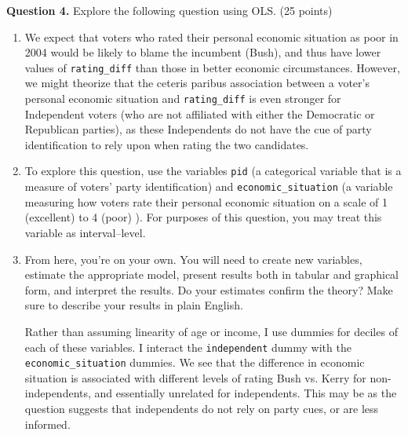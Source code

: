 \documentclass[12pt]{article}
\begin{document}
\vspace{4mm} 
\textbf{Question 4.} \hspace{3mm} Explore the following question using OLS. (25 points)
\vspace{4mm} 

\renewcommand{\theenumi}{\alph{enumi}}
\begin{enumerate}

\item We expect that voters who rated their personal economic situation as poor in 2004 would be likely to blame the incumbent (Bush), and thus have lower values of \verb|rating_diff| than those in better economic circumstances. However, we might theorize that the ceteris paribus association between a voter's personal economic situation and \verb|rating_diff| is even stronger for Independent voters (who are not affiliated with either the Democratic or Republican parties), as these Independents do not have the cue of party identification to rely upon when rating the two candidates.

\item To explore this question, use the variables \verb|pid| (a categorical variable that is a measure of voters' party identification) and \verb|economic_situation| (a variable measuring how voters rate their personal economic situation on a scale of 1 (excellent) to 4 (poor) ). For purposes of this question, you may treat this variable as interval--level.

\item From here, you're on your own. You will need to create new variables, estimate the appropriate model, present results both in tabular and graphical form, and interpret the results. Do your estimates confirm the theory? Make sure to describe your results in plain English.\\

\vspace{4mm} 

Rather than assuming linearity of age or income, I use dummies for deciles of each of these variables. I interact the \verb|independent| dummy with the \verb|economic_situation| dummies.  We see that the difference in economic situation is associated with different levels of rating Bush vs. Kerry for non-independents, and essentially unrelated for independents. This may be as the question suggests that independents do not rely on party cues, or are less informed.


\end{enumerate}
\end{document}
